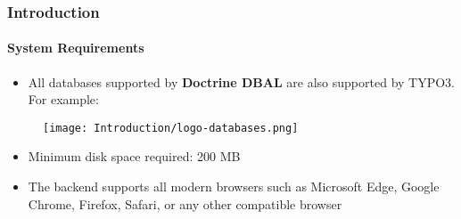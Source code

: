 %

\begin{frame}[fragile]
	\frametitle{Introduction}
	\framesubtitle{System Requirements}

	\begin{itemize}
		\item All databases supported by \textbf{Doctrine DBAL} are also supported
			by TYPO3. For example:
	\end{itemize}

	\begin{figure}
		\texttt{[image: Introduction/logo-databases.png]}
	\end{figure}

	\begin{itemize}
		\item Minimum disk space required: 200 MB
		\item The backend supports all modern browsers such as Microsoft Edge,
			Google Chrome, Firefox, Safari, or any other compatible browser
	\end{itemize}

\end{frame}

